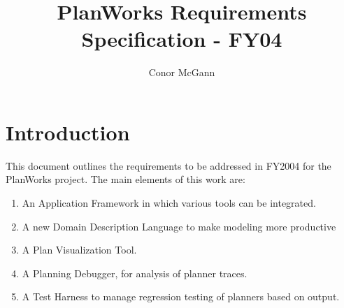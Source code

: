 \documentclass[twoside, 11pt]{article}
\author{Conor McGann}
\title{PlanWorks Requirements Specification - FY04}
\begin{document}
\maketitle

\section{Introduction}
This document outlines the requirements to be addressed in FY2004 for the PlanWorks project. The main elements of this work are:
\begin{enumerate}
\item An Application Framework in which various tools can be integrated.
\item A new Domain Description Language to make modeling more productive
\item A Plan Visualization Tool.
\item A Planning Debugger, for analysis of planner traces.
\item A Test Harness to manage regression testing of planners based on output.
\end{enumerate}
\end{document}
